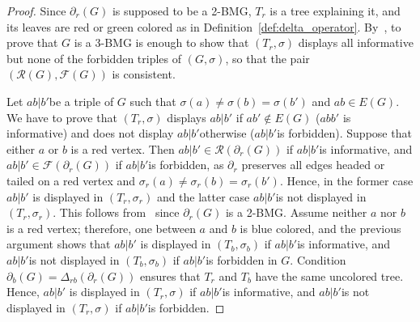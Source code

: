 \documentclass[final,3p,times]{elsarticle}
\begin{document}
\begin{proof}
Since $\partial_{r}(G)$ is supposed to be a 2-BMG, $T_r$ is a tree explaining it, and its leaves are red or green colored as in Definition~\ref{def:delta_operator}. By~\cite[Proposition~2.3]{korchmaros2021quasi}, to prove that $G$ is a 3-BMG is enough to show that $(T_r,\sigma)$ displays all informative but none of the forbidden triples of $(G,\sigma)$, so that the pair $(\mathscr{R}(G),\mathscr{F}(G))$ is consistent.

Let $ab|b'$be a triple of $G$ such that $\sigma(a)\ne \sigma(b)=\sigma(b')$ and $ab\in E(G)$. We have to prove that $(T_r,\sigma)$ displays $ab|b'$ if $ab'\notin E(G)$ ($ abb'$ is informative) and does not display $ab|b'$otherwise ($ab|b'$is forbidden). Suppose that either $a$ or $b$ is a red vertex. Then $ab|b'\in \mathscr{R}(\partial_{r}(G))$ if $ab|b'$is informative, and $ab|b'\in \mathscr{F}(\partial_{r}(G))$ if $ab|b'$is forbidden, as $\partial_{r}$ preserves all edges headed or tailed on a red vertex and $\sigma_r(a)\ne \sigma_r(b)=\sigma_r(b')$. Hence, in the former case $ab|b'$ is displayed in $(T_r,\sigma_r)$ and the latter case $ab|b'$is not displayed in $(T_r,\sigma_r)$. This follows from~\cite[Proposition~2.3]{korchmaros2021quasi} since $\partial_{r}(G)$ is a 2-BMG. Assume neither $a$ nor $b$ is a red vertex; therefore, one between $a$ and $b$ is blue colored, and the previous argument shows that $ab|b'$ is displayed in $(T_b,\sigma_b)$ if $ab|b'$is informative, and $ab|b'$is not displayed in $(T_b,\sigma_b)$ if $ab|b'$is forbidden in $G$. Condition $\partial_b(G)=\Delta_{rb}(\partial_r(G))$ ensures that $T_r$ and $T_b$ have the same uncolored tree. Hence, $ab|b'$ is displayed in $(T_r,\sigma)$ if $ab|b'$is informative, and $ab|b'$is not displayed in $(T_r,\sigma)$ if $ab|b'$is forbidden.
\end{proof}
\end{document}

